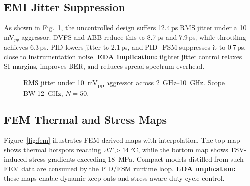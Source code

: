 \documentclass[conference]{IEEEtran}
\begin{document}
\subsection{EMI Jitter Suppression}
As shown in Fig.~\ref{fig:emi}, the uncontrolled design suffers 12.4\,ps RMS jitter under a 10\,mV$_{pp}$ aggressor. DVFS and ABB reduce this to 8.7\,ps and 7.9\,ps, while throttling achieves 6.3\,ps. PID lowers jitter to 2.1\,ps, and PID+FSM suppresses it to 0.7\,ps, close to instrumentation noise.  
\textbf{EDA implication:} tighter jitter control relaxes SI margins, improves BER, and reduces spread-spectrum overhead.

\begin{figure}[t]
\centering
{}
\caption{RMS jitter under \SI{10}{mV_{pp}} aggressor across \SIrange{2}{10}{GHz}. Scope BW \SI{12}{GHz}, $N=50$.}
\label{fig:emi}
\end{figure}

\subsection{FEM Thermal and Stress Maps}
Figure~\ref{fig:fem} illustrates FEM-derived maps with interpolation.  
The top map shows thermal hotspots reaching $\Delta T>\SI{14}{\celsius}$, while the bottom map shows TSV-induced stress gradients exceeding \SI{18}{MPa}. Compact models distilled from such FEM data are consumed by the PID/FSM runtime loop.  
\textbf{EDA implication:} these maps enable dynamic keep-outs and stress-aware duty-cycle control.
\end{document}
